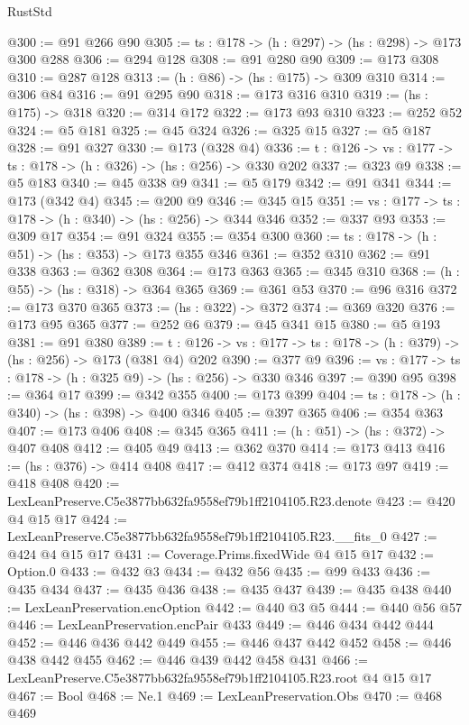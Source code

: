 \begin{lexlean}{RustStd}
\begin{coremodule}
@300 := @91 @266 @90
@305 := {ts : @178} -> (h : @297) -> (hs : @298) -> @173 @300 @288
@306 := @294 @128
@308 := @91 @280 @90
@309 := @173 @308
@310 := @287 @128
@313 := (h : @86) -> (hs : @175) -> @309 @310
@314 := @306 @84
@316 := @91 @295 @90
@318 := @173 @316 @310
@319 := (hs : @175) -> @318
@320 := @314 @172
@322 := @173 @93 @310
@323 := @252 @52
@324 := @5 @181
@325 := @45 @324
@326 := @325 @15
@327 := @5 @187
@328 := @91 @327
@330 := @173 (@328 @4)
@336 := {t : @126} -> {vs : @177} -> {ts : @178} -> (h : @326) -> (hs : @256) -> @330 @202
@337 := @323 @9
@338 := @5 @183
@340 := @45 @338 @9
@341 := @5 @179
@342 := @91 @341
@344 := @173 (@342 @4)
@345 := @200 @9
@346 := @345 @15
@351 := {vs : @177} -> {ts : @178} -> (h : @340) -> (hs : @256) -> @344 @346
@352 := @337 @93
@353 := @309 @17
@354 := @91 @324
@355 := @354 @300
@360 := {ts : @178} -> (h : @51) -> (hs : @353) -> @173 @355 @346
@361 := @352 @310
@362 := @91 @338
@363 := @362 @308
@364 := @173 @363
@365 := @345 @310
@368 := (h : @55) -> (hs : @318) -> @364 @365
@369 := @361 @53
@370 := @96 @316
@372 := @173 @370 @365
@373 := (hs : @322) -> @372
@374 := @369 @320
@376 := @173 @95 @365
@377 := @252 @6
@379 := @45 @341 @15
@380 := @5 @193
@381 := @91 @380
@389 := {t : @126} -> {vs : @177} -> {ts : @178} -> (h : @379) -> (hs : @256) -> @173 (@381 @4) @202
@390 := @377 @9
@396 := {vs : @177} -> {ts : @178} -> (h : @325 @9) -> (hs : @256) -> @330 @346
@397 := @390 @95
@398 := @364 @17
@399 := @342 @355
@400 := @173 @399
@404 := {ts : @178} -> (h : @340) -> (hs : @398) -> @400 @346
@405 := @397 @365
@406 := @354 @363
@407 := @173 @406
@408 := @345 @365
@411 := (h : @51) -> (hs : @372) -> @407 @408
@412 := @405 @49
@413 := @362 @370
@414 := @173 @413
@416 := (hs : @376) -> @414 @408
@417 := @412 @374
@418 := @173 @97
@419 := @418 @408
@420 := LexLeanPreserve.C5e3877bb632fa9558ef79b1ff2104105.R23.denote
@423 := @420 @4 @15 @17
@424 := LexLeanPreserve.C5e3877bb632fa9558ef79b1ff2104105.R23.__fits_0
@427 := @424 @4 @15 @17
@431 := Coverage.Prims.fixedWide @4 @15 @17
@432 := Option.{0}
@433 := @432 @3
@434 := @432 @56
@435 := @99 @433
@436 := @435 @434
@437 := @435 @436
@438 := @435 @437
@439 := @435 @438
@440 := LexLeanPreservation.encOption
@442 := @440 @3 @5
@444 := @440 @56 @57
@446 := LexLeanPreservation.encPair @433
@449 := @446 @434 @442 @444
@452 := @446 @436 @442 @449
@455 := @446 @437 @442 @452
@458 := @446 @438 @442 @455
@462 := @446 @439 @442 @458 @431
@466 := LexLeanPreserve.C5e3877bb632fa9558ef79b1ff2104105.R23.root @4 @15 @17
@467 := Bool
@468 := Ne.{1}
@469 := LexLeanPreservation.Obs
@470 := @468 @469

\end{coremodule}
\end{lexlean}
